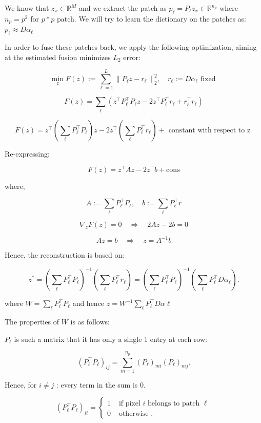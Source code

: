 \documentclass{article}
\theoremstyle{definition}
\begin{document}
We know that $z_x \in \mathbb{R}^M$ and we extract the patch as $p_{\ell}=P_{\ell} z_x \in \mathbb{R}^{n_p}$ where $n_p=p^2$ for $p*p$ patch. We will try to learn the dictionary on the patches as:
$p_{\ell} \approx D \alpha_{\ell}$

In order to fuse these patches back, we apply the following optimization, aiming at the estimated fusion minimizes $L_2$ error:

$$
\min _z F(z):=\sum_{\ell=1}^L\left\|P_{\ell} z-r_{\ell}\right\|_2^2, \quad r_{\ell}:=D \alpha_{\ell} \text { fixed }
$$

$$
F(z)=\sum_{\ell}\left(z^{\top} P_{\ell}^{\top} P_{\ell} z-2 z^{\top} P_{\ell}^{\top} r_{\ell}+r_{\ell}^{\top} r_{\ell}\right)
$$

$$
F(z)=z^{\top}\left(\sum_{\ell} P_{\ell}^{\top} P_{\ell}\right) z-2 z^{\top}\left(\sum_{\ell} P_{\ell}^{\top} r_{\ell}\right)+\text { constant with respect to z }
$$


Re-expressing:

$$
F(z)=z^{\top} A z-2 z^{\top} b+\mathrm{cons}
$$

where,

$$
A:=\sum_{\ell} P_{\ell}^{\top} P_{\ell}, \quad b:=\sum_{\ell} P_{\ell}^{\top} r
$$

$$
\nabla_z F(z)=0 \quad \Longrightarrow \quad 2 A z-2 b=0
$$

$$
A z=b \quad \Longrightarrow \quad z=A^{-1} b
$$


Hence, the reconstruction is based on:

$$
z^*=\left(\sum_{\ell} P_{\ell}^{\top} P_{\ell}\right)^{-1}\left(\sum_{\ell} P_{\ell}^{\top} r_{\ell}\right)=\left(\sum_{\ell} P_{\ell}^{\top} P_{\ell}\right)^{-1}\left(\sum_{\ell} P_{\ell}^{\top} D \alpha_{\ell}\right) .
$$

where $W=\sum_{\ell} P_{\ell}^{\top} P_{\ell}$ and hence $z=W^{-1} \sum_{\ell} P_{\ell}^{\top} D \alpha \ell$


The properties of $W$ is as follows:

$P_\ell$ is such a matrix that it has only a single 1 entry at each row:


$$
\left(P_{\ell}^{\top} P_{\ell}\right)_{i j}=\sum_{m=1}^{n_p}\left(P_{\ell}\right)_{m i}\left(P_{\ell}\right)_{m j} .
$$

Hence, for $i \neq j$ : every term in the sum is 0.

$$
\left(P_{\ell}^{\top} P_{\ell}\right)_{i i}= \begin{cases}1 & \text { if pixel } i \text { belongs to patch } \ell \\ 0 & \text { otherwise } .\end{cases}
$$
\end{document}
